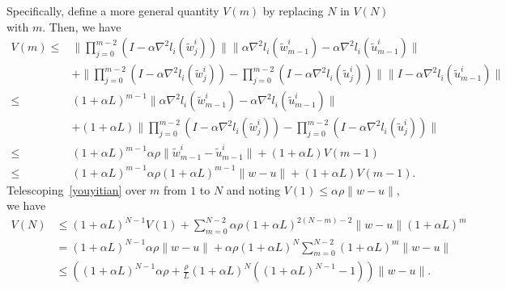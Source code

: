 \documentclass{osudissert96}
\begin{document}
	Specifically, define a more general quantity $V(m)$ by replacing $N$ in $V(N)$ with $m$.
	 Then, we have 
	\begin{align}\label{youyitian}
	V(m) 
	\leq& \Big\| \prod_{j=0}^{m-2}(I-\alpha \nabla^2 l_i(\widetilde w^i_{j})) \Big\|\big\|\alpha \nabla^2 l_i(\widetilde w_{m-1}^i) -\alpha \nabla^2 l_i(\widetilde u_{m-1}^i)  \big\| \nonumber
	\\&+ \Big\|\prod_{j=0}^{m-2}(I-\alpha \nabla^2 l_i(\widetilde w^i_{j})) - \prod_{j=0}^{m-2}(I-\alpha \nabla^2 l_i(\widetilde u^i_{j}))\Big\| \big\|I-\alpha\nabla^2 l_i(\widetilde u_{m-1}^i) \big\| \nonumber
	\\\leq& (1+\alpha L)^{m-1} \big\|\alpha \nabla^2 l_i(\widetilde w_{m-1}^i) -\alpha \nabla^2 l_i(\widetilde u_{m-1}^i)  \big\| \nonumber
	\\&+ (1+\alpha L)\Big\|\prod_{j=0}^{m-2}(I-\alpha \nabla^2 l_i(\widetilde w^i_{j})) - \prod_{j=0}^{m-2}(I-\alpha \nabla^2 l_i(\widetilde u^i_{j}))\Big\| \nonumber
	\\\leq & (1+\alpha L)^{m-1} \alpha \rho \|\widetilde w_{m-1}^i - \widetilde u_{m-1}^i\| + (1+\alpha L)V(m-1) \nonumber
	\\\leq & (1+\alpha L)^{m-1} \alpha \rho (1+\alpha L)^{m-1} \|w-u\| + (1+\alpha L)V(m-1). 
	\end{align}
	Telescoping~\cref{youyitian} over $m$ from $1$ to $N$ and noting $V(1) \leq \alpha \rho\|w-u\|$, we have 
	\begin{align}\label{vbbn}
	V(N)&\leq (1+\alpha L)^{N-1}V(1) + \sum_{m=0}^{N-2}\alpha \rho (1+\alpha L)^{2(N-m)-2}\|w-u\|(1+\alpha L)^m \nonumber
	\\& =  (1+\alpha L)^{N-1}\alpha \rho \|w-u\| +\alpha \rho (1+\alpha L)^N\sum_{m=0}^{N-2} (1+\alpha L)^{m}\|w-u\| \nonumber
	\\& \leq \left( (1+\alpha L)^{N-1}\alpha \rho + \frac{\rho}{L} (1+\alpha L)^N ((1+\alpha L)^{N-1}-1)\right) \|w-u\|.
	\end{align}
\end{document}
